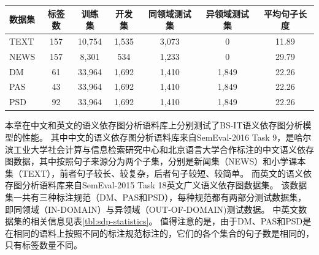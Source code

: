 \begin{table}[htbp]
    \vspace{0.5em}\centering\wuhao
    \begin{tabular}{lcccccc}
        \toprule[1.5pt]
        数据集 & 标签数 & 训练集 & 开发集 & 同领域测试集 & 异领域测试集 & 平均句子长度 \\
        \midrule[1pt]
        TEXT & 157 & 10,754 & 1,535 & 3,073 & 0     & 11.89 \\
        NEWS & 157 & 8,301  & 534   & 1,233 & 0     & 29.79 \\
        DM   & 61  & 33,964 & 1,692 & 1,410 & 1,849 & 22.26 \\
        PAS  & 43  & 33,964 & 1,692 & 1,410 & 1,849 & 22.26 \\
        PSD  & 92  & 33,964 & 1,692 & 1,410 & 1,849 & 22.26 \\
        \bottomrule[1.5pt]
    \end{tabular}
\end{table}

本章在中文和英文的语义依存图分析语料库上分别测试了BS-IT语义依存图分析模型的性能。
其中中文的语义依存图分析语料库来自SemEval-2016 Task 9\cite{che-etal-2016-semeval}，是哈尔滨工业大学社会计算与信息检索研究中心和北京语言大学合作标注的中文语义依存图数据，其中按照句子来源分为两个子集，分别是新闻集（NEWS）和小学课本集（TEXT），前者句子较长、较复杂，后者句子较短、较简单。
而英文的语义依存图分析语料库来自SemEval-2015 Task 18\cite{oepen-etal-2015-semeval}英文广义语义依存图数据集。
该数据集一共有三种标注规范（DM、PAS和PSD），每种规范都有两部分测试数据集，即同领域（IN-DOMAIN）与异领域（OUT-OF-DOMAIN)测试数据。
中英文数据集的相关信息见表\ref{tbl:sdp-statistics}。
值得注意的是，由于DM、PAS和PSD是在相同的语料上按照不同的标注规范标注的，它们的各个集合的句子数是相同的，只有标签数量不同。

